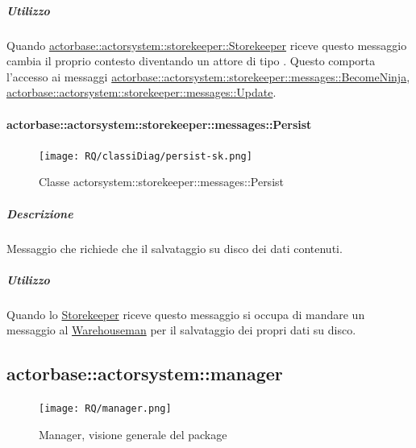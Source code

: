 \documentclass{scalatekids-article}
\begin{document}
\subparagraph{Utilizzo}
Quando \hyperref[sec:actorbase::actorsystem::storekeeper::Storekeeper]{actorbase::actorsystem::storekeeper::Storekeeper}
riceve questo messaggio cambia il proprio contesto diventando un attore di tipo . Questo comporta l'accesso ai messaggi
\hyperref[sec:actorbase::actorsystem::storekeeper::messages::BecomeNinja]{actorbase::\allowbreak{}actorsystem::\allowbreak{}storekeeper::\allowbreak{}messages::\allowbreak{}BecomeNinja},
\hyperref[sec:actorbase::actorsystem::storekeeper::messages::Update]{actorbase::\allowbreak{}actorsystem::\allowbreak{}storekeeper::\allowbreak{}messages::\allowbreak{}Update}.

\paragraph{actorbase::actorsystem::storekeeper::messages::Persist}
\label{sec:actorbase::actorsystem::storekeeper::messages::Persist}

\begin{figure}[H]
   \begin{center}
     \texttt{[image: RQ/classiDiag/persist-sk.png]}
     \caption{Classe actorsystem::storekeeper::messages::Persist}
   \end{center}
 \end{figure}

\subparagraph{Descrizione}
Messaggio che richiede che il salvataggio su disco dei dati contenuti.

\subparagraph{Utilizzo}
Quando lo \hyperref[sec:actorbase::actorsystem::storekeeper::Storekeeper]{Storekeeper}
riceve questo messaggio si occupa di mandare un messaggio al \hyperref[sec:actorbase::actorsystem::warehouseman::Warehouseman]{Warehouseman}
per il salvataggio dei propri dati su disco.



\subsection{actorbase::actorsystem::manager}
\label{sec:actorbase::actorsystem::manager}

\begin{figure}[H]
  \begin{center}
    \texttt{[image: RQ/manager.png]}
    \caption{Manager, visione generale del package}
  \end{center}
\end{figure}
\end{document}

